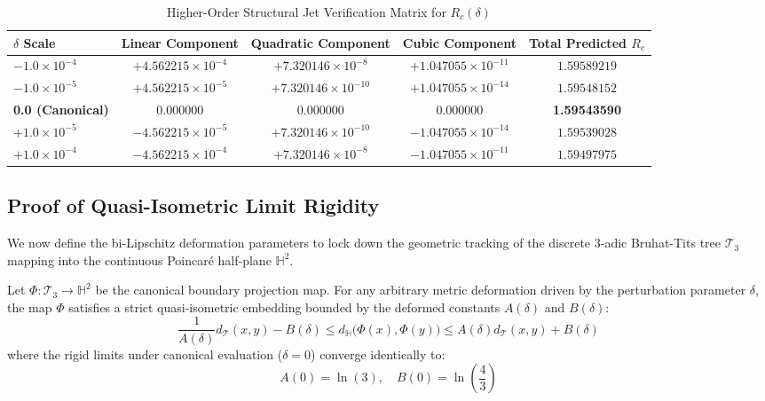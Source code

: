 \begin{table}[h!]
\centering
\caption{Higher-Order Structural Jet Verification Matrix for $R_c(\delta)$}
\label{tab:taylor_components}
\begin{tabular}{lcccc}
\hline
$\delta$ Scale & Linear Component & Quadratic Component & Cubic Component & Total Predicted $R_c$ \\ \hline
$-1.0 \times 10^{-4}$ & $+4.562215 \times 10^{-4}$ & $+7.320146 \times 10^{-8}$ & $+1.047055 \times 10^{-11}$ & $1.59589219$ \\
$-1.0 \times 10^{-5}$ & $+4.562215 \times 10^{-5}$ & $+7.320146 \times 10^{-10}$ & $+1.047055 \times 10^{-14}$ & $1.59548152$ \\
\textbf{0.0 (Canonical)} & $0.000000$ & $0.000000$ & $0.000000$ & \textbf{1.59543590} \\
$+1.0 \times 10^{-5}$ & $-4.562215 \times 10^{-5}$ & $+7.320146 \times 10^{-10}$ & $-1.047055 \times 10^{-14}$ & $1.59539028$ \\
$+1.0 \times 10^{-4}$ & $-4.562215 \times 10^{-4}$ & $+7.320146 \times 10^{-8}$ & $-1.047055 \times 10^{-11}$ & $1.59497975$ \\ \hline
\end{tabular}
\end{table}

\subsection{Proof of Quasi-Isometric Limit Rigidity}
We now define the bi-Lipschitz deformation parameters to lock down the geometric tracking of the discrete 3-adic Bruhat-Tits tree $\mathcal{T}_3$ mapping into the continuous Poincaré half-plane $\mathbb{H}^2$.

\begin{theorem}
Let $\Phi: \mathcal{T}_3 \to \mathbb{H}^2$ be the canonical boundary projection map. For any arbitrary metric deformation driven by the perturbation parameter $\delta$, the map $\Phi$ satisfies a strict quasi-isometric embedding bounded by the deformed constants $A(\delta)$ and $B(\delta)$:
\begin{equation}
\frac{1}{A(\delta)} d_{\mathcal{T}}(x, y) - B(\delta) \le d_{\mathbb{H}}\big(\Phi(x), \Phi(y)\big) \le A(\delta) d_{\mathcal{T}}(x, y) + B(\delta)
\end{equation}
where the rigid limits under canonical evaluation ($\delta = 0$) converge identically to:
\begin{equation}
A(0) = \ln(3), \quad B(0) = \ln\left(\frac{4}{3}\right)
\end{equation}
\end{theorem}

